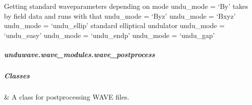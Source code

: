 \documentclass[letterpaper,10pt,english]{sphinxmanual}
\begin{document}
\begin{fulllineitems}

\begin{fulllineitems}
\label{\detokenize{autoapi/unduwave/wave_modules/wave_parameters/index:unduwave.wave_modules.wave_parameters.wave_prog_parameters.get_std_paras}}
\pysigstartsignatures
{}
\pysigstopsignatures
\sphinxAtStartPar
Getting standard wave\sphinxhyphen{}parameters depending on mode
\sphinxhyphen{} undu\_mode = ‘By’ \sphinxhyphen{} takes by field data and runs with that
\sphinxhyphen{} undu\_mode = ‘Byz’
\sphinxhyphen{} undu\_mode = ‘Bxyz’
\sphinxhyphen{} undu\_mode = ‘undu\_ellip’ \sphinxhyphen{} standard elliptical undulator
\sphinxhyphen{} undu\_mode = ‘undu\_easy’
\sphinxhyphen{} undu\_mode = ‘undu\_endp’
\sphinxhyphen{} undu\_mode = ‘undu\_gap’

\end{fulllineitems}


\end{fulllineitems}


\sphinxstepscope


\subparagraph{unduwave.wave\_modules.wave\_postprocess}
\label{\detokenize{autoapi/unduwave/wave_modules/wave_postprocess/index:module-unduwave.wave_modules.wave_postprocess}}\label{\detokenize{autoapi/unduwave/wave_modules/wave_postprocess/index:unduwave-wave-modules-wave-postprocess}}\label{\detokenize{autoapi/unduwave/wave_modules/wave_postprocess/index::doc}}

\subparagraph{Classes}
\label{\detokenize{autoapi/unduwave/wave_modules/wave_postprocess/index:classes}}

\begin{savenotes}\sphinxattablestart
\sphinxthistablewithglobalstyle
\sphinxthistablewithnovlinesstyle
\centering
\begin{tabulary}{\linewidth}[t]{}
\sphinxtoprule
\sphinxtableatstartofbodyhook
\sphinxAtStartPar
{\hyperref[\detokenize{autoapi/unduwave/wave_modules/wave_postprocess/index:unduwave.wave_modules.wave_postprocess.wave_postprocess}]{}}
&
\sphinxAtStartPar
A class for postprocessing WAVE files.
\\
\sphinxbottomrule
\end{tabulary}
\sphinxtableafterendhook\par
\sphinxattableend\end{savenotes}
\end{document}
